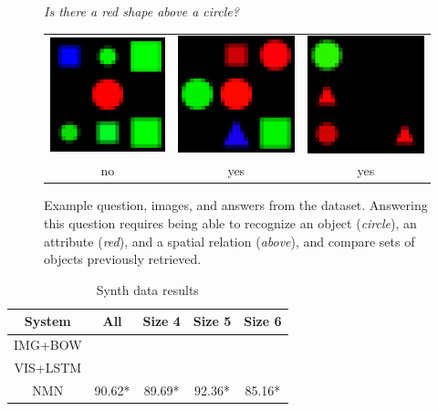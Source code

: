 \documentclass[10pt,twocolumn,letterpaper]{article}
\begin{document}
\begin{figure}
  \centering
  \emph{Is there a red shape above a circle?} \\[1em]
  \begin{tabular}{ccc}
    \includegraphics[width=0.25\columnwidth]{fig/shapes1_big} &
    \includegraphics[width=0.25\columnwidth]{fig/shapes2_big} &
    \includegraphics[width=0.25\columnwidth]{fig/shapes3_big} \\
    no & yes & yes
  \end{tabular}
  \caption{Example question, images, and answers from the \shapes dataset.
    Answering this question requires being able to recognize an object
    (\emph{circle}), an attribute (\emph{red}), and a spatial relation
    (\emph{above}), and compare sets of objects previously retrieved.}
\end{figure}



\begin{table}
  \footnotesize
  \centering
  \begin{tabular}{ccccc}
    \toprule
    System & All & Size 4 & Size 5 & Size 6 \\
    \midrule
    IMG+BOW & \\
    VIS+LSTM &  \\
    NMN & 90.62* & 89.69* & 92.36* & 85.16* \\
    \bottomrule
  \end{tabular}
  \caption{Synth data results}
\end{table}
\end{document}
